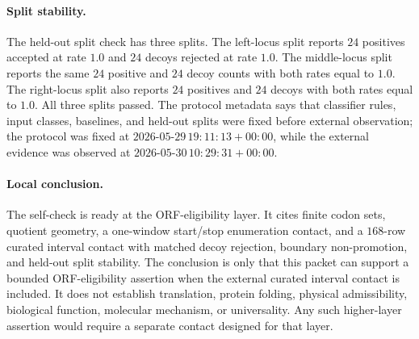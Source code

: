 \paragraph{Split stability.}
The held-out split check has three splits.  The left-locus split reports $24$ positives accepted at rate $1.0$ and $24$ decoys rejected at rate $1.0$.  The middle-locus split reports the same $24$ positive and $24$ decoy counts with both rates equal to $1.0$.  The right-locus split also reports $24$ positives and $24$ decoys with both rates equal to $1.0$.  All three splits passed.  The protocol metadata says that classifier rules, input classes, baselines, and held-out splits were fixed before external observation; the protocol was fixed at $2026$-$05$-$29\,19{:}11{:}13+00{:}00$, while the external evidence was observed at $2026$-$05$-$30\,10{:}29{:}31+00{:}00$.

\paragraph{Local conclusion.}
The self-check is ready at the ORF-eligibility layer.  It cites finite codon sets, quotient geometry, a one-window start/stop enumeration contact, and a $168$-row curated interval contact with matched decoy rejection, boundary non-promotion, and held-out split stability.  The conclusion is only that this packet can support a bounded ORF-eligibility assertion when the external curated interval contact is included.  It does not establish translation, protein folding, physical admissibility, biological function, molecular mechanism, or universality.  Any such higher-layer assertion would require a separate contact designed for that layer.
